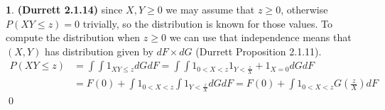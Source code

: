 \documentclass[10.5pt]{article}
\theoremstyle{definition}
\newtheorem{pb}{}
\begin{document}
    \begin{pb}\textbf{(Durrett 2.1.14)}
        since \(X,Y \geq 0\) we may assume that \(z \geq 0\), otherwise \(P(XY \leq z) = 0\) trivially, so the distribution is known for those values. To compute the distribution when \(z \geq 0\) we can use that
        independence means that \((X,Y)\) has distribution given by \(dF\times dG\) (Durrett Proposition 2.1.11).
        \begin{align*}
            P(XY \leq z) &= \int\int 1_{XY \leq z}dGdF = \int\int 1_{0 < X < z}1_{Y < \frac{z}{X}} + 1_{X = 0} dGdF \\ &= F(0) + \int 1_{0 < X < z}\int 1_{Y < \frac{z}{X}}dG dF = F(0) + \int 1_{0<X<z}G(\frac{z}{X})dF
        \end{align*} \qed
    \end{pb}
\end{document}

